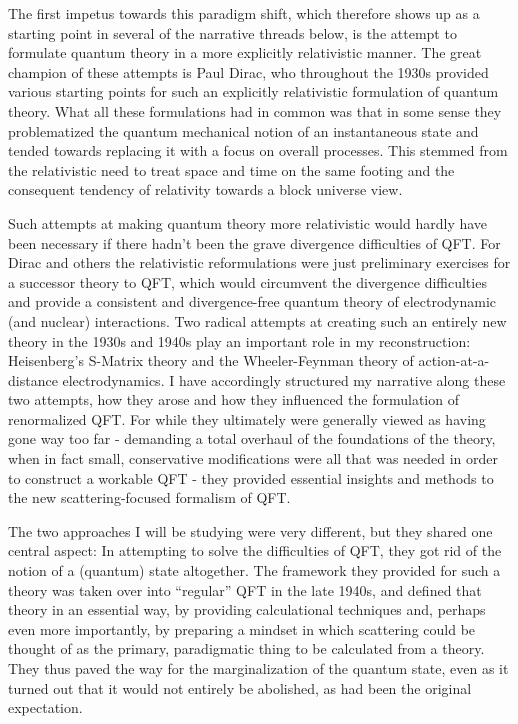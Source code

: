 \documentclass[12pt,a4paper]{article}
\begin{document}
The first impetus towards this paradigm shift, which therefore shows up as a starting point in several of the narrative threads below, is the attempt to formulate quantum theory in a more explicitly relativistic manner. The great champion of these attempts is Paul Dirac, who throughout the 1930s provided various starting points for such an explicitly relativistic formulation of quantum theory. What all these formulations had in common was that in some sense they problematized the quantum mechanical notion of an instantaneous state and tended towards replacing it with a focus on overall processes. This stemmed from the relativistic need to treat space and time on the same footing and the consequent tendency of relativity towards a block universe view.

Such attempts at making quantum theory more relativistic would hardly have been necessary if there hadn't been the grave divergence difficulties of QFT. For Dirac and others the relativistic reformulations were just preliminary exercises for a successor theory to QFT, which would circumvent the divergence difficulties and provide a consistent and divergence-free quantum theory of electrodynamic (and nuclear) interactions. Two radical attempts at creating such an entirely new theory  in the 1930s and 1940s play an important role in my reconstruction: Heisenberg's S-Matrix theory and the Wheeler-Feynman theory of action-at-a-distance electrodynamics. I have accordingly structured my narrative along these two attempts, how they arose and how they influenced the formulation of renormalized QFT. For while they ultimately were generally viewed as having gone way too far - demanding a total overhaul of the foundations of the theory, when in fact small, conservative modifications were all that was needed in order to construct a workable QFT - they provided essential insights and methods to the new scattering-focused formalism of QFT.

The two approaches I will be studying were very different, but they shared one central aspect: In attempting to solve the difficulties of QFT, they got rid of the notion of a (quantum) state altogether. The framework they provided for such a theory was taken over into ``regular'' QFT in the late 1940s, and defined that theory in an essential way, by providing calculational techniques and, perhaps even more importantly, by preparing a mindset in which scattering could be thought of as the primary, paradigmatic thing to be calculated from a theory. They thus paved the way for the marginalization of the quantum state, even as it turned out that it would not entirely be abolished, as had been the original expectation.
\end{document}
